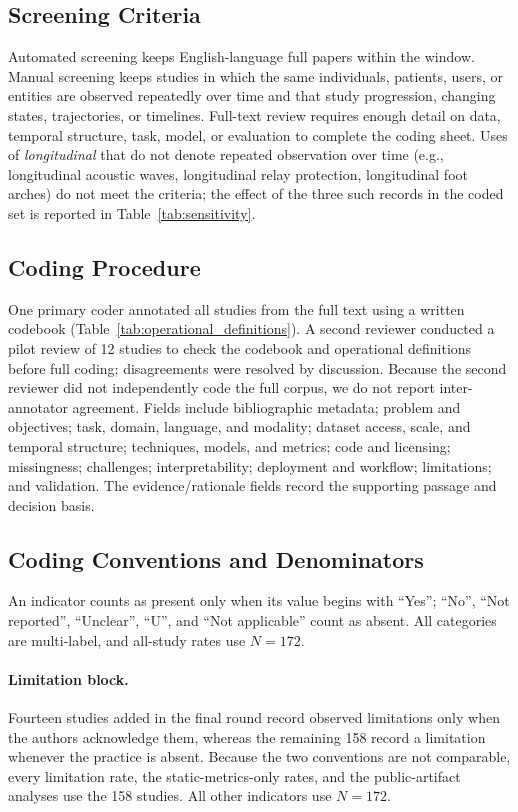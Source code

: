 \documentclass[11pt]{article}
\theoremstyle{plain}
\theoremstyle{definition}
\theoremstyle{remark}
\begin{document}
\subsection{Screening Criteria}
\label{sec:appendix_screening}
Automated screening keeps English-language full papers within the window. Manual screening keeps studies in which the same individuals, patients, users, or entities are observed repeatedly over time and that study progression, changing states, trajectories, or timelines. Full-text review requires enough detail on data, temporal structure, task, model, or evaluation to complete the coding sheet. Uses of \emph{longitudinal} that do not denote repeated observation over time (e.g., longitudinal acoustic waves, longitudinal relay protection, longitudinal foot arches) do not meet the criteria; the effect of the three such records in the coded set is reported in Table~\ref{tab:sensitivity}.

\subsection{Coding Procedure}
\label{sec:appendix_extraction}
One primary coder annotated all studies from the full text using a written codebook (Table~\ref{tab:operational_definitions}). A second reviewer conducted a pilot review of 12 studies to check the codebook and operational definitions before full coding; disagreements were resolved by discussion. Because the second reviewer did not independently code the full corpus, we do not report inter-annotator agreement.
Fields include bibliographic metadata; problem and objectives; task, domain, language, and modality; dataset access, scale, and temporal structure; techniques, models, and metrics; code and licensing; missingness; challenges; interpretability; deployment and workflow; limitations; and validation. The evidence/rationale fields record the supporting passage and decision basis.

\subsection{Coding Conventions and Denominators}
\label{sec:appendix_conventions}
An indicator counts as present only when its value begins with ``Yes''; ``No'', ``Not reported'', ``Unclear'', ``U'', and ``Not applicable'' count as absent. All categories are multi-label, and all-study rates use $N=172$.

\paragraph{Limitation block.} Fourteen studies added in the final round record observed limitations only when the authors acknowledge them, whereas the remaining 158 record a limitation whenever the practice is absent. Because the two conventions are not comparable, every limitation rate, the static-metrics-only rates, and the public-artifact analyses use the 158  studies. All other indicators use $N=172$.
\end{document}
